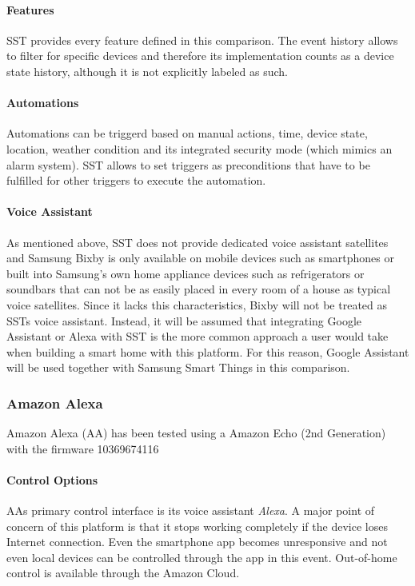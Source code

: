 \paragraph{Features}
SST provides every feature defined in this comparison. The event history allows to filter for specific devices and therefore its implementation counts as a device state history, although it is not explicitly labeled as such.

\paragraph{Automations}
Automations can be triggerd based on manual actions, time, device state, location, weather condition and its integrated security mode (which mimics an alarm system). SST allows to set triggers as preconditions that have to be fulfilled for other triggers to execute the automation.

\paragraph{Voice Assistant}
As mentioned above, SST does not provide dedicated voice assistant satellites and Samsung Bixby is only available on mobile devices such as smartphones or built into Samsung's own home appliance devices such as refrigerators or soundbars that can not be as easily placed in every room of a house as typical voice satellites. Since it lacks this characteristics, Bixby will not be treated as SSTs voice assistant. Instead, it will be assumed that integrating Google Assistant or Alexa with SST is the more common approach a user would take when building a smart home with this platform. For this reason, Google Assistant will be used together with Samsung Smart Things in this comparison.

\newpage
\subsubsection{Amazon Alexa}
Amazon Alexa (AA) has been tested using a Amazon Echo (2nd Generation) with the firmware 10369674116

\paragraph{Control Options}
AAs primary control interface is its voice assistant \textit{Alexa}.
A major point of concern of this platform is that it stops working completely if the device loses Internet connection. Even the smartphone app becomes unresponsive and not even local devices can be controlled through the app in this event. Out-of-home control is available through the Amazon Cloud.

